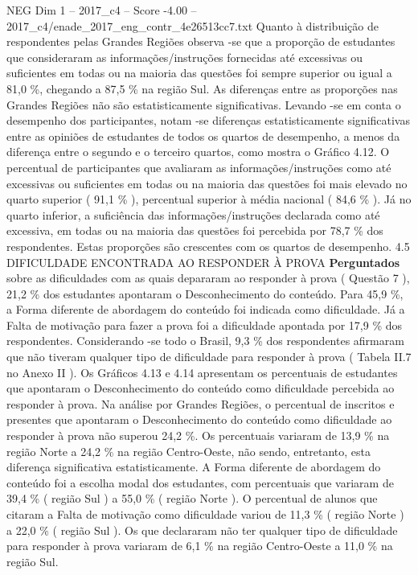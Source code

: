 \begin{textsample}{NEG Dim 1 – 2017\_c4 – Score -4.00 – 2017\_c4/enade\_2017\_eng\_contr\_4e26513cc7.txt}
Quanto à distribuição de respondentes pelas Grandes Regiões observa -se que a proporção de estudantes que consideraram as informações/instruções fornecidas até excessivas ou suficientes em todas ou na maioria das questões foi sempre superior ou igual a 81,0 \%, chegando a 87,5 \% na região Sul.
As diferenças entre as proporções nas Grandes Regiões não são estatisticamente significativas.
Levando -se em conta o desempenho dos participantes, notam -se diferenças estatisticamente significativas entre as opiniões de estudantes de todos os quartos de desempenho, a menos da diferença entre o segundo e o terceiro quartos, como mostra o Gráfico 4.12.
O percentual de participantes que avaliaram as informações/instruções como até excessivas ou suficientes em todas ou na maioria das questões foi mais elevado no quarto superior ( 91,1 \% ), percentual superior à média nacional ( 84,6 \% ).
Já no quarto inferior, a suficiência das informações/instruções declarada como até excessiva, em todas ou na maioria das questões foi percebida por 78,7 \% dos respondentes.
Estas proporções são crescentes com os quartos de desempenho. 4.5 DIFICULDADE ENCONTRADA AO RESPONDER À PROVA \textbf{Perguntados} sobre as dificuldades com as quais depararam ao responder à prova ( Questão 7 ), 21,2 \% dos estudantes apontaram o Desconhecimento do conteúdo.
Para 45,9 \%, a Forma diferente de abordagem do conteúdo foi indicada como dificuldade.
Já a Falta de motivação para fazer a prova foi a dificuldade apontada por 17,9 \% dos respondentes.
Considerando -se todo o Brasil, 9,3 \% dos respondentes afirmaram que não tiveram qualquer tipo de dificuldade para responder à prova ( Tabela II.7 no Anexo II ).
Os Gráficos 4.13 e 4.14 apresentam os percentuais de estudantes que apontaram o Desconhecimento do conteúdo como dificuldade percebida ao responder à prova.
Na análise por Grandes Regiões, o percentual de inscritos e presentes que apontaram o Desconhecimento do conteúdo como dificuldade ao responder à prova não superou 24,2 \%.
Os percentuais variaram de 13,9 \% na região Norte a 24,2 \% na região Centro-Oeste, não sendo, entretanto, esta diferença significativa estatisticamente.
A Forma diferente de abordagem do conteúdo foi a escolha modal dos estudantes, com percentuais que variaram de 39,4 \% ( região Sul ) a 55,0 \% ( região Norte ).
O percentual de alunos que citaram a Falta de motivação como dificuldade variou de 11,3 \% ( região Norte ) a 22,0 \% ( região Sul ).
Os que declararam não ter qualquer tipo de dificuldade para responder à prova variaram de 6,1 \% na região Centro-Oeste a 11,0 \% na região Sul.

\end{textsample}

